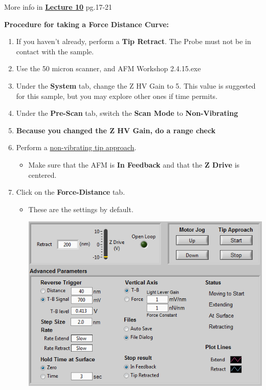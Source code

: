 \documentclass{../lab}
\begin{document}
More info in\textbf{ }\href{http://experimentationlab.berkeley.edu/sites/default/files/AFMImages/Lecture\_10\_AFM.pdf}{\textbf{Lecture 10}} pg.17-21

\textbf{Procedure for taking a Force Distance Curve:}

\begin{enumerate}
    \item If you haven't already, perform a \textbf{Tip Retract}. The Probe must not be in contact with the sample.

    \item Use the 50 micron scanner, and AFM Workshop 2.4.15.exe

    \item Under the \textbf{System} tab, change the Z HV Gain to 5.  This value is suggested for this sample, but you may explore other ones if time permits.

    \item Under the \textbf{Pre-Scan} tab, switch the \textbf{Scan Mode} to \textbf{Non-Vibrating}

    \item \textbf{Because you changed the Z HV Gain, do a range check}

    \item Perform a \hyperref[subsec:TipApproach]{non-vibrating tip approach}.
    \begin{itemize}
        \item Make sure that the AFM is \textbf{In Feedback} and that the \textbf{Z Drive} is centered.
    \end{itemize}

    \item Click on the \textbf{Force-Distance} tab.
    \begin{itemize}
        \item These are the settings by default.
        \begin{center}
            \href{http://experimentationlab.berkeley.edu/sites/default/files/FD.png}{\includegraphics[width=0.9\linewidth]{images/FD.png}}
        \end{center}
    \end{itemize}
    

\end{enumerate}
\end{document}
